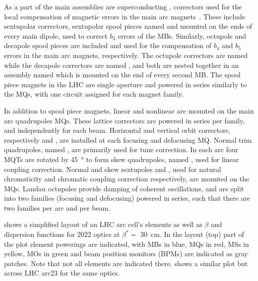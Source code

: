 As a part of the main assemblies are superconducting , correctors used for the local compensation of magnetic errors in the main arc magnets~\cite{BOOK:Bruning:LHC_Design_Report_Main_Ring}.
These include sextupolar correctors, sextupolar spool pieces named  and mounted on the ends of every main dipole, used to correct \(b_3\) errors of the MBs.
Similarly, octupole and decapole spool pieces are included and used for the compensation of \(b_4\) and \(b_5\) errors in the main arc magnets, respectively.
The octupole correctors are named  while the decapole correctors are named , and both are nested together in an assembly named  which is mounted on the end of every second MB.
The spool piece magnets in the LHC are single aperture and powered in series similarly to the MQs, with one circuit assigned for each magnet family.

In addition to spool piece magnets, linear and nonlinear  are mounted on the main arc quadrupoles MQs.
These lattice correctors are powered in series per family, and independently for each beam.
Horizontal and vertical orbit correctors, respectively  and , are installed at each focusing and defocusing MQ.
Normal trim quadrupoles, named , are primarily used for tune correction.
In each arc four MQTs are rotated by \qty{45}{\degree} to form skew quadrupoles, named , used for linear coupling correction.
Normal and skew sextupoles  and , used for natural chromaticity and chromatic coupling correction respectively, are mounted on the MQs.
Landau octupoles  provide damping of coherent oscillations, and are split into two families (focusing and defocusing) powered in series, such that there are two families per arc and per beam.

 shows a simplified layout of an LHC arc cell's elements as well as \(\beta\) and dispersion functions for \num{2022} optics at \(\beta^{\ast} =\) \qty{30}{\centi\meter}.
In the layout (top) part of the plot element powerings are indicated, with MBs in \textcolor{latwiss_blue}{blue}, MQs in \textcolor{latwiss_red}{red}, MSs in \textcolor{latwiss_yellow}{yellow}, MOs in \textcolor{latwiss_green}{green} and beam position monitors (BPMs) are indicated as gray patches.
Note that not all elements are indicated there.
 shows a similar plot but across LHC arc\num{23} for the same optics.

